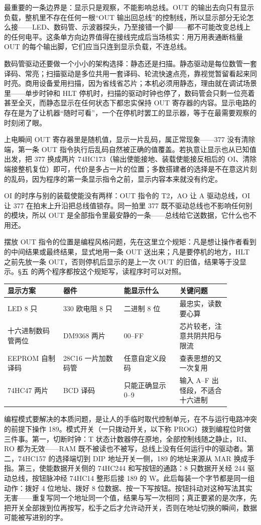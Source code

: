最重要的一条边界是：显示只是观察，不能影响总线。OUT 的输出去向只有显示负载，整机里不存在任何一根“OUT 输出回总线”的控制线，所以显示部分无论怎么接——LED、数码管、示波器探头，乃至接错一个脚——都不可能改变总线上的任何电平。这条单方向边界值得在接线完成后当场核实：用万用表通断档量 OUT 的每个输出脚，它们应当只连到显示负载，不连总线。

数码管驱动还要做一个小小的架构选择：静态还是扫描。静态驱动是每位数管一套译码、常亮；扫描驱动是多位共用一套译码、轮流快速点亮，靠视觉暂留看起来同时亮。商用设备爱用扫描，因为省线省芯片；本机必须用静态，理由就在调试场景里——单步时钟和 HLT 停机时，扫描的驱动时钟也停了，数码管会只剩一位亮着甚至全灭，而静态显示在任何状态下都忠实保持 OUT 寄存器的内容。显示电路的存在是为了让机器“随时可看”，一个在停机时罢工的显示器，等于在最需要观察的时刻闭了眼。

上电瞬间 OUT 寄存器里是随机值，显示一片乱码，属正常现象——377 没有清除端，第一条 OUT 指令执行后乱码自然被正确的值覆盖。若执意让显示也从已知值出发，把 377 换成两片 74HC173（输出使能接地、装载使能接反相后的 OI、清除端接整机复位）即可，代价是多占一片的位置；多数搭建者的选择是不在意这片刻的乱码，因为程序的第一条显示指令之前，显示内容本来就没有约定。

OI 的时序与别的装载使能没有两样：OUT 指令的 T2，AO 让 A 驱动总线，OI 让 377 在拍末上升沿把总线值锁存。同一拍里 377 既不驱动总线也不影响任何别的模块，所以 OUT 是全部指令里最安静的一条——总线给它送数据，它什么也不用还。

摆放 OUT 指令的位置是编程风格问题，先在这里立个规矩：凡是想让操作者看到的中间结果或最终结果，显式地用一条 OUT 送出来；凡是要停机的地方，HLT 之前先放一条 OUT，否则停机后显示的是上一次 OUT 的旧值，结果等于没显示。§五 的两个程序都按这个规矩写，读程序时可以对照。

\begin{longtable}{L{0.22\linewidth}L{0.24\linewidth}L{0.22\linewidth}L{0.20\linewidth}}
\toprule
显示方案 & 器件 & 能显示什么 & 关键问题 \\
\midrule
LED 8 只 & 330 欧电阻 8 只 & 二进制 8 位 & 最忠实，读数要心算 \\
十六进制数码管两位 & DM9368 两片 & 00–FF & 芯片较老，注意共阴共阳与限流 \\
EEPROM 自制译码 & 28C16 一片加数码管 & 任意自定义段码 & 查表思想的又一次复用 \\
74HC47 两片 & BCD 译码 & 只能正确显示 0–9 & 输入 A–F 出怪段，不适合十六进制 \\
\bottomrule
\end{longtable}

编程模式要解决的本质问题，是让人的手临时取代控制单元，在不与运行电路冲突的前提下操作 189。模式开关（一只拨动开关，以下称 PROG）拨到编程位时做三件事。第一，切断时钟：T 状态计数器停在原地，全部控制线随之静止，RI、RO 都为无效——RAM 既不被读也不被写，总线上没有任何运行中的驱动者。第二，74HC157 的选择端切到 DIP 地址开关一侧，189 的地址来源从 MAR 换成手指。第三，使能数据开关侧的 74HC244 和写按钮的通路：8 只数据开关经 244 驱动总线，按钮脉冲经 74HC14 整形后接 189 的 W。此后每装一个字节都是同一组动作：拨好 4 位地址、拨好 8 位数据、按一下写按钮。按钮抖动对这种写法其实无害——重复写同一个地址同一个值，结果与写一次相同；真正要紧的是次序，先把开关全部拨到位再按写，松手之后才允许动开关，否则在地址切换的瞬间，数据可能被写进别的字。

